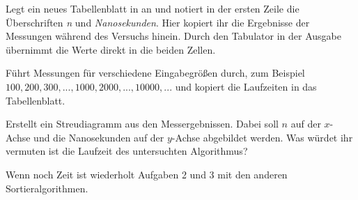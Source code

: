 \documentclass[10pt, a4paper]{scrartcl}
\begin{document}
\begin{aufgabe}
	Legt ein neues Tabellenblatt in  an und notiert in der ersten Zeile die Überschriften \emph{n} und \emph{Nanosekunden}. Hier kopiert ihr die Ergebnisse der Messungen während des Versuchs hinein. Durch den Tabulator in der Ausgabe übernimmt  die Werte direkt in die beiden Zellen.

	Führt Messungen für verschiedene Eingabegrößen durch, zum Beispiel $100, 200, 300, ..., 1000, 2000, ..., 10000, ...$ und kopiert die Laufzeiten in das Tabellenblatt.
\end{aufgabe}

\begin{aufgabe}
	Erstellt ein Streudiagramm aus den Messergebnissen. Dabei soll $n$ auf der $x$-Achse und die Nanosekunden auf der $y$-Achse abgebildet werden. Was würdet ihr vermuten ist die Laufzeit des untersuchten Algorithmus?
\end{aufgabe}

\bigskip
Wenn noch Zeit ist wiederholt Aufgaben 2 und 3 mit den anderen Sortieralgorithmen.
\end{document}
